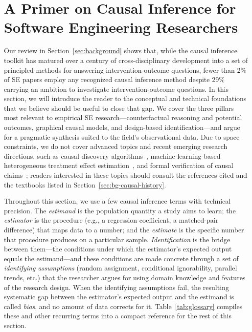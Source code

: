 \section{A Primer on Causal Inference for Software Engineering Researchers}
\label{sec:primer}

Our review in Section~\ref{sec:background} shows that, while the causal inference toolkit has matured over a century of cross-disciplinary development into a set of principled methods for answering intervention-outcome questions, fewer than 2\% of SE papers employ any recognized causal inference method despite 29\% carrying an ambition to investigate intervention-outcome questions.
In this section, we will introduce the reader to the conceptual and technical foundations that we believe should be useful to close that gap.
We cover the three pillars most relevant to empirical SE research---counterfactual reasoning and potential outcomes, graphical causal models, and design-based identification---and argue for a pragmatic synthesis suited to the field's observational data.
Due to space constraints, we do not cover advanced topics and recent emerging research directions, such as causal discovery algorithms~\cite{journals/ese/HulseEM25}, machine-learning-based heterogeneous treatment effect estimation~\cite{chernozhukov2018double, athey2016recursive}, and formal verification of causal claims~\cite{halpern2016actual}; readers interested in these topics should consult the references cited and the textbooks listed in Section~\ref{sec:bg-causal-history}.

Throughout this section, we use a few causal inference terms with technical precision.
The \emph{estimand} is the population quantity a study aims to learn; the \emph{estimator} is the procedure (e.g., a regression coefficient, a matched-pair difference) that maps data to a number; and the \emph{estimate} is the specific number that procedure produces on a particular sample.
\emph{Identification} is the bridge between them---the conditions under which the estimator's expected output equals the estimand---and these conditions are made concrete through a set of \emph{identifying assumptions} (random assignment, conditional ignorability, parallel trends, etc.) that the researcher argues for using domain knowledge and features of the research design.
When the identifying assumptions fail, the resulting systematic gap between the estimator's expected output and the estimand is called \emph{bias}, and no amount of data corrects for it.
Table~\ref{tab:glossary} compiles these and other recurring terms into a compact reference for the rest of this section.

